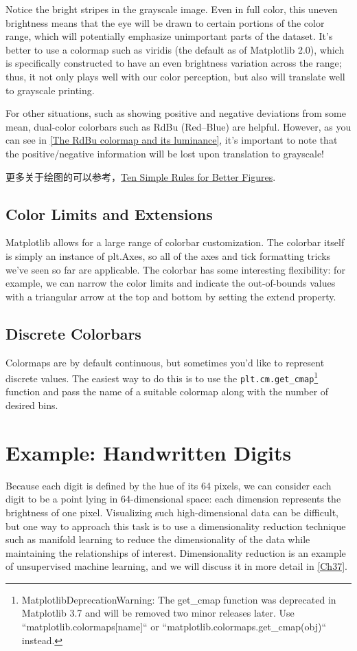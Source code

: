 
Notice the bright stripes in the grayscale image. Even in full color, this uneven brightness means that the eye will be drawn to certain portions of the color range, which
will potentially emphasize unimportant parts of the dataset. It’s better to use a colormap such as viridis (the default as of Matplotlib 2.0), which is specifically constructed to have an even brightness variation across the range; thus, it not only plays well
with our color perception, but also will translate well to grayscale printing.

For other situations, such as showing positive and negative deviations from some
mean, dual-color colorbars such as RdBu (Red–Blue) are helpful. However, as you can
see in \autoref{The RdBu colormap and its luminance}, it’s important to note that the positive/negative information will be
lost upon translation to grayscale!

更多关于绘图的可以参考，\href{https://journals.plos.org/ploscompbiol/article?id=10.1371/journal.pcbi.1003833}{Ten Simple Rules for Better Figures}.
\subsection*{Color Limits and Extensions}
Matplotlib allows for a large range of colorbar customization. The colorbar itself is
simply an instance of plt.Axes, so all of the axes and tick formatting tricks we’ve seen
so far are applicable. The colorbar has some interesting flexibility: for example, we
can narrow the color limits and indicate the out-of-bounds values with a triangular
arrow at the top and bottom by setting the extend property.

\subsection*{Discrete Colorbars}

Colormaps are by default continuous, but sometimes you’d like to represent discrete
values. The easiest way to do this is to use the \verb|plt.cm.get_cmap|\footnote{MatplotlibDeprecationWarning: The get\_cmap function was deprecated in Matplotlib 3.7 and will be removed two minor releases later. Use ``matplotlib.colormaps[name]`` or ``matplotlib.colormaps.get\_cmap(obj)`` instead.} function and pass the
name of a suitable colormap along with the number of desired bins.

\section{Example: Handwritten Digits}
Because each digit is defined by the hue of its 64 pixels, we can consider each digit to
be a point lying in 64-dimensional space: each dimension represents the brightness of
one pixel. Visualizing such high-dimensional data can be difficult, but one way to
approach this task is to use a dimensionality reduction technique such as manifold
learning to reduce the dimensionality of the data while maintaining the relationships
of interest. Dimensionality reduction is an example of unsupervised machine learning, and we will discuss it in more detail in \autoref{Ch37}.